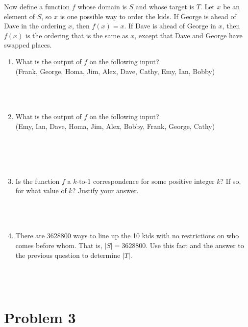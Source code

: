 \documentclass{amsart}
\theoremstyle{definition}
\theoremstyle{Exercise}
\theoremstyle{remark}
\theoremstyle{rule}
\numberwithin{equation}{section}
\begin{document}
Now define a function $f$ whose domain is $S$ and whose target is $T$. Let $x$ be an element of $S$, so $x$ is one possible way to order the kids. If George is ahead of Dave in the ordering $x$, then $f(x) = x$. If Dave is ahead of George in $x$, then $f(x)$ is the ordering that is the same as $x$, except that Dave and George have swapped places.\\
\begin{enumerate}[label=(\alph*)]
  \item What is the output of $f$ on the following input?\\
  (Frank, George, Homa, Jim, Alex, Dave, Cathy, Emy, Ian, Bobby)\\\\
\\\\
  \item What is the output of $f$ on the following input?\\
(Emy, Ian, Dave, Homa, Jim, Alex, Bobby, Frank, George, Cathy)\\\\
\\\\\
  \item Is the function $f$ a $k$-to-1 correspondence for some positive integer $k$? If so, for what value of $k$? Justify your answer.\\\\
\\\\
  \item There are 3628800 ways to line up the 10 kids with no restrictions on who comes before whom. That is, $|S| =3628800$. Use this fact and the answer to the previous question to determine $|T|$.\\\\
\\\\
\end{enumerate}

   
   \newpage

\section*{Problem 3}
   
\end{document}
